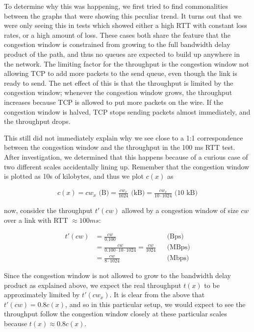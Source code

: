 To determine why this was happening, we first tried to find commonalities
between the graphs that were showing this peculiar trend. It turns out that we
were only seeing this in tests which showed either a high RTT with constant loss
rates, or a high amount of loss. These cases both share the feature that the
congestion window is constrained from growing to the full bandwidth delay
product of the path, and thus no queues are expected to build up anywhere in the
network. The limiting factor for the throughput is the congestion window not
allowing TCP to add more packets to the send queue, even though the link is
ready to send. The net effect of this is that the throughput is limited by the
congestion window; whenever the congestion window grows, the throughput
increases because TCP is allowed to put more packets on the wire. If the
congestion window is halved, TCP stops sending packets almost immediately, and
the throughput drops.

This still did not immediately explain why we see close to a 1:1 correspondence
between the congestion window and the throughput in the 100 ms RTT test. After
investigation, we determined that this happens because of a curious case of two
different scales accidentally lining up. Remember that the congestion window is
plotted as 10s of kilobytes, and thus we plot $c(x)$ as

\begin{align*}
  c(x) = cw_x \text{\ (B)}
       = \frac{cw_x}{1024} \text{\ (kB)}
       = \frac{cw_x}{10 \cdot 1024} \text{\ (10 kB)}
\end{align*}

now, consider the throughput $t'(cw)$ allowed by a congestion window of size
$cw$ over a link with RTT $\approx 100ms$:

\begin{align*}
  t'(cw) &= \frac{cw}{0.100}                       &&\text{(Bps)} \\
         &= \frac{cw}{0.100 \cdot 10 \cdot 1024}
          = \frac{cw}{1024}                        &&\text{(MBps)} \\
         &= \frac{cw}{8 \cdot 1024}                &&\text{(Mbps)}
\end{align*}

Since the congestion window is not allowed to grow to the bandwidth delay
product as explained above, we expect the real throughput $t(x)$ to be
approximately limited by $t'(cw_x)$. It is clear from the above that $t'(cw) =
0.8 c(x)$, and so in this particular setup, we would expect to see the
throughput follow the congestion window closely at these particular scales
because $t(x) \approx 0.8 c(x)$.
